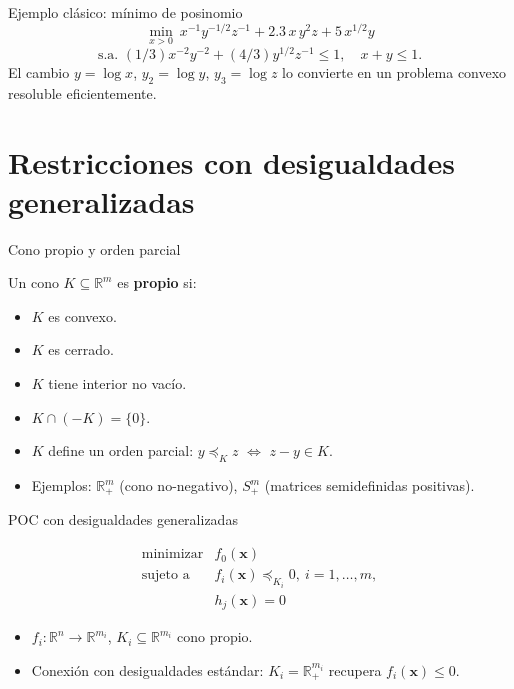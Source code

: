 \documentclass[10pt,aspectratio=169]{beamer}
\newcommand{\R}{\mathbb{R}}
\newcommand{\x}{\mathbf{x}}
\newcommand{\0}{\mathbf{0}}
\begin{document}
\begin{frame}{Ejemplo clásico: mínimo de posinomio}
  \[
    \min_{x>0}\ x^{-1}y^{-1/2}z^{-1} + 2.3\,x\,y^2z + 5\,x^{1/2}y
  \]
  \[
    \text{s.a. } (1/3)x^{-2}y^{-2} + (4/3)y^{1/2}z^{-1}\le 1,\quad
    x+y\le 1.
  \]
  El cambio $y=\log x$, $y_2=\log y$, $y_3=\log z$ lo convierte en un
  problema convexo resoluble eficientemente.
\end{frame}

\section{Restricciones con desigualdades generalizadas}
\begin{frame}{Cono propio y orden parcial}
  \begin{definition}
    Un cono $K\subseteq\R^m$ es \textbf{propio} si:
    \begin{itemize}
      \item $K$ es convexo.
      \item $K$ es cerrado.
      \item $K$ tiene interior no vacío.
      \item $K\cap(-K)=\{0\}$.
    \end{itemize}
  \end{definition}
  \begin{itemize}
    \item $K$ define un orden parcial: $y\preceq_K z$ $\Leftrightarrow$ $z-y\in K$.
    \item Ejemplos: $\R_+^m$ (cono no-negativo), $S_+^m$ (matrices
      semidefinidas positivas).
  \end{itemize}
\end{frame}

\begin{frame}{POC con desigualdades generalizadas}
  \begin{block}{}
    \[
      \begin{array}{ll}
        \text{minimizar} & f_0(\x) \\
        \text{sujeto a}  & f_i(\x)\preceq_{K_i} 0,\ i=1,\dots,m,\\
                         & h_j(\x)=0
      \end{array}
    \]
  \end{block}
  \begin{itemize}
    \item $f_i:\R^n\to\R^{m_i}$, $K_i\subseteq\R^{m_i}$ cono propio.
    \item Conexión con desigualdades estándar: $K_i=\R_+^{m_i}$ recupera
      $f_i(\x)\le 0$.
  \end{itemize}
\end{frame}
\end{document}
